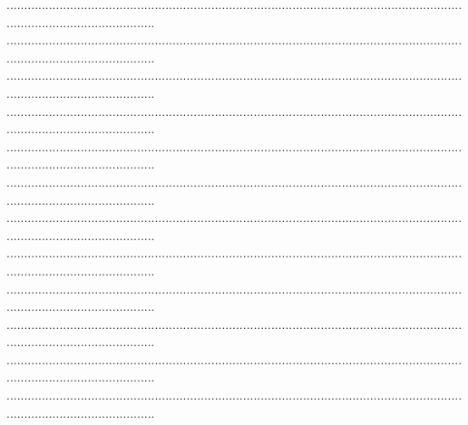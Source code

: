 \documentclass{article}
\begin{document}
\begin{footnotesize}
\begin{enumerate}
\begin{enumerate}
        ...........................................................................................................................................................................\newline
        ...........................................................................................................................................................................\newline
        ...........................................................................................................................................................................\newline
        ...........................................................................................................................................................................\newline
        ...........................................................................................................................................................................\newline
        ...........................................................................................................................................................................\newline
        ...........................................................................................................................................................................\newline
        ...........................................................................................................................................................................\newline
        ...........................................................................................................................................................................\newline
        ...........................................................................................................................................................................\newline
        ...........................................................................................................................................................................\newline
        ...........................................................................................................................................................................\newline

\end{enumerate}
\end{enumerate}
\end{footnotesize}
\end{document}

